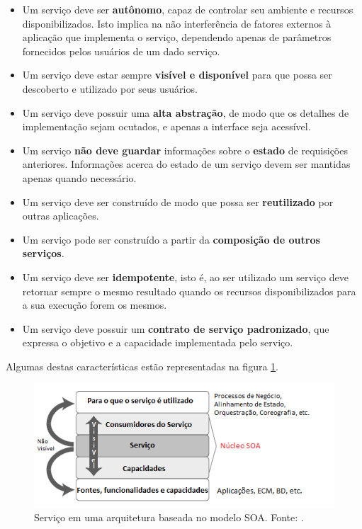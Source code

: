 \begin{itemize}
\item Um serviço deve ser \textbf{autônomo},  capaz de controlar seu ambiente e recursos disponibilizados. Isto implica na não interferência de fatores externos à aplicação que implementa o serviço, dependendo apenas de parâmetros fornecidos pelos usuários de um dado serviço.

\item Um serviço deve estar sempre \textbf{visível e disponível} para que possa ser descoberto e utilizado por seus usuários.

\item Um serviço deve possuir uma \textbf{alta abstração}, de modo que os detalhes de implementação sejam ocutados, e apenas a interface seja acessível.

\item Um serviço \textbf{não deve guardar} informações sobre o \textbf{estado} de requisições anteriores. Informações acerca do estado de um serviço devem ser mantidas apenas quando necessário.

\item Um serviço deve ser construído de modo que possa ser \textbf{reutilizado} por outras aplicações.

\item Um serviço pode ser construído a partir da \textbf{composição de outros serviços}.

\item Um serviço deve ser \textbf{idempotente}, isto é, ao ser utilizado um serviço deve retornar sempre o mesmo resultado quando os recursos disponibilizados para a sua execução forem os mesmos.

\item Um serviço deve possuir um \textbf{contrato de serviço padronizado}, que expressa o objetivo e a capacidade implementada pelo serviço.
\end{itemize}

Algumas destas características estão representadas na figura \ref{servico_na_arquitetura}.

\begin{figure}[htb]
\centering
\includegraphics[scale=0.8]{figuras/servico_na_arquitetura.png}
\caption{Serviço em uma arquitetura baseada no modelo SOA. Fonte: \cite{nickull_service_2007}.}
\label{servico_na_arquitetura}
\end{figure}

